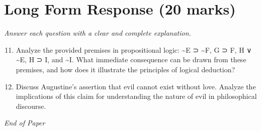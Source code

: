 \documentclass[12pt]{article}
\begin{document}
\section*{Long Form Response (20 marks)}
\textit{Answer each question with a clear and complete explanation.}
\begin{enumerate}[label=\arabic*.]
\setcounter{enumi}{10}
\item Analyze the provided premises in propositional logic: \textasciitilde{}E ⊃ \textasciitilde{}F, G ⊃ F, H ∨ \textasciitilde{}E, H ⊃ I, and \textasciitilde{}I. What immediate consequence can be drawn from these premises, and how does it illustrate the principles of logical deduction?
\item Discuss Augustine's assertion that evil cannot exist without love. Analyze the implications of this claim for understanding the nature of evil in philosophical discourse.
\end{enumerate}

\vfill
\noindent\textit{End of Paper}
\end{document}
